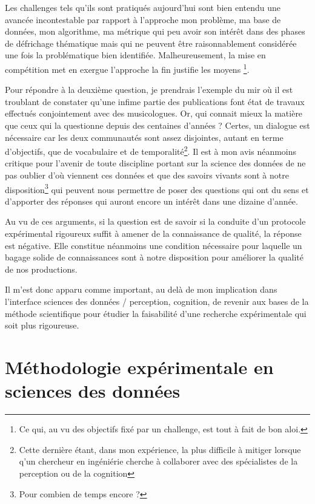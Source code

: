 Les challenges tels qu'ils sont pratiqués aujourd'hui sont bien entendu une avancée incontestable par rapport à l'approche \fg mon problème, ma base de données, mon algorithme, ma métrique \og qui peu avoir son intérêt dans des phases de défrichage thématique mais qui ne peuvent être raisonnablement considérée une fois la problématique bien identifiée. Malheureusement, la mise en compétition met en exergue l'approche \og la fin justifie les moyens \fg \footnote{Ce qui, au vu des objectifs fixé par un challenge, est tout à fait de bon aloi.}.

Pour répondre à la deuxième question, je prendrais l'exemple du mir où il est troublant de constater qu'une infime partie des publications font état de travaux effectués conjointement avec des musicologues. Or, qui connait mieux la matière que ceux qui la questionne depuis des centaines d'années ? Certes, un dialogue est nécessaire car les deux communautés sont assez disjointes, autant en terme d'objectifs, que de vocabulaire et de temporalité\footnote{Cette dernière étant, dans mon expérience, la plus difficile à mitiger lorsque q'un chercheur en ingéniérie cherche à collaborer avec des spécialistes de la perception ou de la cognition}. Il est à mon avis néanmoins critique pour l'avenir de toute discipline portant sur la science des données de ne pas oublier d'où viennent ces données et que des savoirs vivants sont à notre disposition\footnote{Pour combien de temps encore ?} qui peuvent nous permettre de poser des questions qui ont du sens et d'apporter des réponses qui auront encore un intérêt dans une dizaine d'année.

Au vu de ces arguments, si la question est de savoir si la conduite d'un protocole expérimental rigoureux suffit à amener de la connaissance de qualité, la réponse est négative. Elle constitue néanmoins une condition nécessaire pour laquelle un bagage solide de connaissances sont à notre disposition pour améliorer la qualité de nos productions.

Il m'est donc apparu comme important, au delà de mon implication dans l'interface sciences des données / perception, cognition, de revenir aux bases de la méthode scientifique pour étudier la faisabilité d'une recherche expérimentale qui soit plus rigoureuse.

\section{ \nmu Méthodologie expérimentale en sciences des données} \label{sec:xp}

